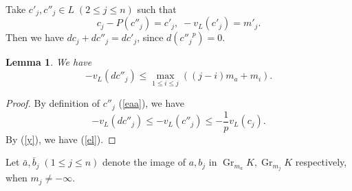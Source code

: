 \documentclass[10pt,a4paper]{amsart}
\numberwithin{equation}{section}
\newcommand{\Gr}{\operatorname{Gr}}
\theoremstyle{plain}
\newtheorem{lemm}[theo]{Lemma}
\theoremstyle{definition}
\begin{document}
Take $c'_j,c''_j\in L\;(2\leq j\leq n)$ such that
\begin{equation}\label{eaa}
c_j-P(c''_j)=c'_j,\; -v_L(c'_j)=m'_j.
\end{equation}
Then we have $dc_j+dc''_j=dc'_j$, since $d({c''_j}^p)=0$. 


  

  

\begin{lemm}\label{laee}
  We have
  \begin{equation}\label{el}
  -v_L(dc''_j)\leq\max_{1\leq i\leq j}((j-i)m_a+m_{i}).
  \end{equation}
\end{lemm}

\begin{proof}
  By definition of $c''_j$ (\ref{eaa}), we have
  \begin{equation}
  -v_L(dc''_j)\leq-v_L(c''_j)\leq-\frac{1}{p}v_L(c_j).
  \end{equation}
  By (\ref{y}), we have (\ref{el}).  
\end{proof}


  

Let $\bar{a},\bar{b}_j\;(1\leq j\leq n)$ denote the image of $a,b_j$ in $\Gr_{m_a}K,\Gr_{m_j}K$ respectively, when $m_j\neq-\infty$.
\end{document}
